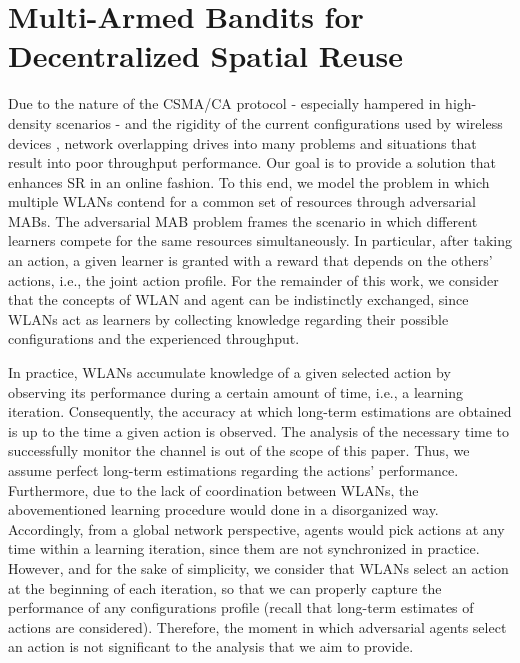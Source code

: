 \documentclass[preprint,12pt]{elsarticle}
\begin{document}
\section{Multi-Armed Bandits for Decentralized Spatial Reuse}
\label{section:mabs}
Due to the nature of the CSMA/CA protocol - especially hampered in high-density scenarios - and the rigidity of the current configurations used by wireless devices \cite{akella2007self}, network overlapping drives into many problems and situations that result into poor throughput performance. Our goal is to provide a solution that enhances SR in an online fashion. To this end, we model the problem in which multiple WLANs contend for a common set of resources through adversarial MABs. The adversarial MAB problem \cite{auer1995gambling} frames the scenario in which different learners compete for the same resources simultaneously. In particular, after taking an action, a given learner is granted with a reward that depends on the others' actions, i.e., the joint action profile. For the remainder of this work, we consider that the concepts of WLAN and agent can be indistinctly exchanged, since WLANs act as learners by collecting knowledge regarding their possible configurations and the experienced throughput. 

In practice, WLANs accumulate knowledge of a given selected action by observing its performance during a certain amount of time, i.e., a learning iteration. Consequently, the accuracy at which long-term estimations are obtained is up to the time a given action is observed. The analysis of the necessary time to successfully monitor the channel is out of the scope of this paper. Thus, we assume perfect long-term estimations regarding the actions' performance. 
Furthermore, due to the lack of coordination between WLANs, the abovementioned learning procedure would done in a disorganized way. Accordingly, from a global network perspective, agents would pick actions at any time within a learning iteration, since them are not synchronized in practice. However, and for the sake of simplicity, we consider that WLANs select an action at the beginning of each iteration, so that we can properly capture the performance of any configurations profile (recall that long-term estimates of actions are considered). Therefore, the moment in which adversarial agents select an action is not significant to the analysis that we aim to provide.
\end{document}
